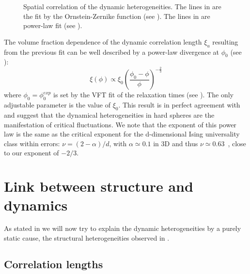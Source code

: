 \begin{figure}
	\centering
	\caption{Spatial correlation of the dynamic heterogeneities. The lines in  are the fit by the Ornstein-Zernike function (see ). The lines in  are power-law fit (see ).}
	\label{fig:dh_fit}
\end{figure}

The volume fraction dependence of the dynamic correlation length $\xi_u$ resulting from the previous fit can be well described by a power-law divergence at $\phi_0$ (see ):
\begin{equation}
	\xi(\phi) \propto \xi_0 \left( \frac{\phi_0 - \phi}{\phi} \right)^{-\frac{2}{3}}
	\label{eq:xi_power}
\end{equation}
where $\phi_0=\phi_0^{exp}$ is set by the \ac{VFT} fit of the relaxation times (see ). The only adjustable parameter is the value of $\xi_0$. This result is in perfect agreement with \citet{tanaka2010critical} and suggest that the dynamical heterogeneities in hard spheres are the manifestation of critical fluctuations. We note that the exponent of this power law is the same as the critical exponent for the d-dimensional Ising universality class within errors: $\nu = (2-\alpha)/d$, with $\alpha \simeq 0.1$ in 3D and thus $\nu \simeq 0.63$~\cite{onuki, Chaikin2000}, close to our exponent of $-2/3$.

\section{Link between structure and dynamics}
\label{sec:struct_vs_dyn}

As stated in  we will now try to explain the dynamic heterogeneities by a purely static cause,  the structural heterogeneities observed in .

\subsection{Correlation lengths}
\label{sec:correlation_lengths}

